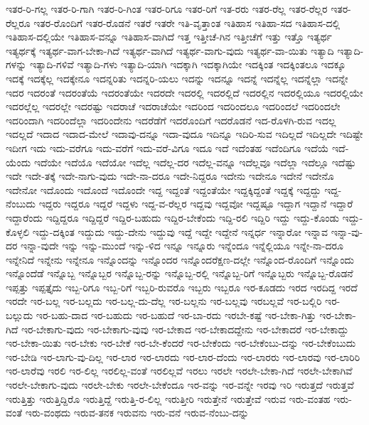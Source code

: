 {ಇತರ-ರಿ-ಗಲ್ಲ
ಇತರ-ರಿ-ಗಾಗಿ
ಇತರ-ರಿ-ಗಿಂತ
ಇತರ-ರಿಗೂ
ಇತರ-ರಿಗೆ
ಇತ-ರರು
ಇತರ-ರೆಲ್ಲ
ಇತರ-ರೆಲ್ಲರ
ಇತರ-ರೆಲ್ಲರೂ
ಇತರ-ರೊಂದಿಗೆ
ಇತರ-ರೊಡನೆ
ಇತರೆ
ಇತರೇ
ಇತಿ-ವೃತ್ತಾಂತ
ಇತಿಹಾಸ
ಇತಿಹಾ-ಸದ
ಇತಿಹಾಸ-ದಲ್ಲಿ
ಇತಿಹಾಸ-ದಲ್ಲಿಯೇ
ಇತಿಹಾಸ-ವನ್ನೂ
ಇತಿಹಾಸ-ವಾಗಿದೆ
ಇತ್ತ
ಇತ್ತೀಚೆ-ಗಿನ
ಇತ್ತೀಚೆಗೆ
ಇತ್ತು
ಇತ್ತೊ
ಇತ್ಯರ್ಥ
ಇತ್ಯರ್ಥಕ್ಕೆ
ಇತ್ಯರ್ಥ-ವಾಗ-ಬೇಕಾ-ಗಿದೆ
ಇತ್ಯರ್ಥ-ವಾಗಿದೆ
ಇತ್ಯರ್ಥ-ವಾಗು-ವುದು
ಇತ್ಯರ್ಥ-ವಾ-ಯಿತು
ಇತ್ಯಾದಿ
ಇತ್ಯಾದಿ-ಗಳನ್ನು
ಇತ್ಯಾದಿ-ಗಳಿವೆ
ಇತ್ಯಾದಿ-ಗಳು
ಇತ್ಯಾದಿ-ಯಾಗಿ
ಇದಕ್ಕಾಗಿ
ಇದಕ್ಕಾಗಿಯೇ
ಇದಕ್ಕಿಂತ
ಇದಕ್ಕಿಂತಲೂ
ಇದಕ್ಕೂ
ಇದಕ್ಕೆ
ಇದಕ್ಕೆಲ್ಲ
ಇದಕ್ಕೇನೂ
ಇದನ್ನರಿತು
ಇದನ್ನರಿ-ಯಲು
ಇದನ್ನು
ಇದನ್ನೂ
ಇದನ್ನೆ
ಇದನ್ನೆಲ್ಲ
ಇದನ್ನೆಲ್ಲಾ
ಇದನ್ನೇ
ಇದರ
ಇದರಂತೆ
ಇದರಂತೆಯೆ
ಇದರಂತೆಯೇ
ಇದರದೇ
ಇದರಲ್ಲಿ
ಇದರಲ್ಲಿದೆ
ಇದರಲ್ಲಿನ
ಇದರಲ್ಲಿಯೂ
ಇದರಲ್ಲಿಯೇ
ಇದರಲ್ಲೆಲ್ಲ
ಇದರಲ್ಲೇ
ಇದರಷ್ಟು
ಇದರಾಚೆ
ಇದರಾಚೆಯೇ
ಇದರಿಂದ
ಇದರಿಂದಲೂ
ಇದರಿಂದಲೆ
ಇದರಿಂದಲೇ
ಇದರಿಂದಾಗಿ
ಇದರಿಂದೆಲ್ಲಾ
ಇದರಿಂದೇನು
ಇದರೆಡೆಗೆ
ಇದರೊಂದಿಗೆ
ಇದರೊಡನೆ
ಇದ-ರೊಳಗಿ-ರುವ
ಇದಲ್ಲ
ಇದಲ್ಲದೆ
ಇದಾದ
ಇದಾದ-ಮೇಲೆ
ಇದಾವು-ದನ್ನೂ
ಇದಾ-ವುದೂ
ಇದಿನ್ನೂ
ಇದಿರಿ-ಸುವ
ಇದಿಲ್ಲದೆ
ಇದಿಲ್ಲದೇ
ಇದಿಷ್ಟೇ
ಇದೀಗ
ಇದು
ಇದು-ವರೆಗೂ
ಇದು-ವರೆಗೆ
ಇದು-ವರೆ-ವಿಗೂ
ಇದೂ
ಇದೆ
ಇದೆಂತಹ
ಇದೆಂದಿಗೂ
ಇದೆಯೆ
ಇದೆ-ಯೆಂದು
ಇದೆಯೇ
ಇದೆಯೊ
ಇದೆಯೋ
ಇದೆಲ್ಲ
ಇದೆಲ್ಲ-ದರ
ಇದೆಲ್ಲ-ವನ್ನೂ
ಇದೆಲ್ಲವೂ
ಇದೆಲ್ಲಾ
ಇದೆಲ್ಲೂ
ಇದೆಷ್ಟು
ಇದೇ
ಇದೇ-ತಕ್ಕೆ
ಇದೇ-ನಾಗು-ವುದು
ಇದೇ-ನಾ-ದರೂ
ಇದೇ-ನಿದ್ದರೂ
ಇದೇನು
ಇದೇನೂ
ಇದೇನೆ
ಇದೇನೊ
ಇದೇನೋ
ಇದೊಂದು
ಇದೊಂದೆ
ಇದೊಂದೇ
ಇದ್ದ
ಇದ್ದಂತೆ
ಇದ್ದಂತೆಯೇ
ಇದ್ದಕ್ಕಿದ್ದಂತೆ
ಇದ್ದಕ್ಕೆ
ಇದ್ದದ್ದು
ಇದ್ದ-ನೆಂಬುದು
ಇದ್ದರು
ಇದ್ದರೂ
ಇದ್ದರೆ
ಇದ್ದಳು
ಇದ್ದ-ವ-ರೆಲ್ಲರ
ಇದ್ದವು
ಇದ್ದವೋ
ಇದ್ದಷ್ಟೂ
ಇದ್ದಾಗ
ಇದ್ದಾನೆ
ಇದ್ದಾರೆ
ಇದ್ದಾರೆಂದು
ಇದ್ದಿದ್ದರೂ
ಇದ್ದಿದ್ದರೆ
ಇದ್ದಿರ-ಬಹುದು
ಇದ್ದಿರ-ಬೇಕೆಂದು
ಇದ್ದಿ-ರಲಿ
ಇದ್ದಿರಿ
ಇದ್ದು
ಇದ್ದು-ಕೊಂಡು
ಇದ್ದು-ಕೊಳ್ಳಲಿ
ಇದ್ದು-ದಕ್ಕಿಂತ
ಇದ್ದುದು
ಇದ್ದು-ದೇನು
ಇದ್ದುವು
ಇದ್ದೆ
ಇದ್ದೇ
ಇದ್ದೇನೆ
ಇನ್ನರ್ಧ
ಇನ್ನಾರೋ
ಇನ್ನಾವ
ಇನ್ನಾ-ವು-ದರ
ಇನ್ನಾ-ವುದೇ
ಇನ್ನು
ಇನ್ನು-ಮುಂದೆ
ಇನ್ನು-ಳಿದ
ಇನ್ನೂ
ಇನ್ನೂರು
ಇನ್ನೆಂದೂ
ಇನ್ನೆಲ್ಲಿಯೂ
ಇನ್ನೇ-ನಾ-ದರೂ
ಇನ್ನೇನಿದೆ
ಇನ್ನೇನು
ಇನ್ನೇನೂ
ಇನ್ನೊಂದನ್ನು
ಇನ್ನೊಂದರ
ಇನ್ನೊಂದರೆಕ್ಷಣ-ದಲ್ಲೇ
ಇನ್ನೊಂದ-ರೊಂದಿಗೆ
ಇನ್ನೊಂದು
ಇನ್ನೊಂದೆಡೆ
ಇನ್ನೊಬ್ಬ
ಇನ್ನೊಬ್ಬರ
ಇನ್ನೊಬ್ಬ-ರನ್ನು
ಇನ್ನೊಬ್ಬ-ರಲ್ಲಿ
ಇನ್ನೊಬ್ಬ-ರಿಗೆ
ಇನ್ನೊಬ್ಬರು
ಇನ್ನೊಬ್ಬ-ರೊಡನೆ
ಇಪ್ಪತ್ತು
ಇಪ್ಪತ್ತೈದು
ಇಬ್ಬ-ರಿಗೂ
ಇಬ್ಬ-ರಿಗೆ
ಇಬ್ಬರಿ-ರುವರೊ
ಇಬ್ಬರು
ಇಬ್ಬರೂ
ಇರ-ಕೂಡದು
ಇರದ
ಇರದಿದ್ದ
ಇರದೆ
ಇರದೇ
ಇರ-ಬಲ್ಲ
ಇರ-ಬಲ್ಲದು
ಇರ-ಬಲ್ಲ-ದು-ದೆಲ್ಲ
ಇರ-ಬಲ್ಲನು
ಇರ-ಬಲ್ಲವು
ಇರಬಲ್ಲವೆ
ಇರ-ಬಲ್ಲಿರಿ
ಇರ-ಬಲ್ಲುದು
ಇರ-ಬಹು-ದಾದ
ಇರ-ಬಹುದು
ಇರ-ಬಹುದೆ
ಇರ-ಬಾ-ರದು
ಇರಬೇ-ಕಷ್ಟೆ
ಇರ-ಬೇಕಾ-ಗಿತ್ತು
ಇರ-ಬೇಕಾ-ಗಿದೆ
ಇರ-ಬೇಕಾಗು-ವುದು
ಇರ-ಬೇಕಾಗು-ವುವು
ಇರ-ಬೇಕಾದ
ಇರ-ಬೇಕಾದದ್ದೇನು
ಇರ-ಬೇಕಾದರೆ
ಇರ-ಬೇಕಾದ್ದು
ಇರ-ಬೇಕಾ-ಯಿತು
ಇರ-ಬೇಕು
ಇರ-ಬೇಕೆ
ಇರ-ಬೇ-ಕೆಂದರೆ
ಇರ-ಬೇಕೆಂದು
ಇರ-ಬೇಕೆಂಬು-ದನ್ನು
ಇರ-ಬೇಕೆಂಬುದು
ಇರ-ಬೇಡಿ
ಇರ-ಲಾಗು-ವು-ದಿಲ್ಲ
ಇರ-ಲಾರ
ಇರ-ಲಾರದು
ಇರ-ಲಾರ-ದೆಂದು
ಇರ-ಲಾರರು
ಇರ-ಲಾರವು
ಇರ-ಲಾರಿರಿ
ಇರ-ಲಾರೆವು
ಇರಲಿ
ಇರ-ಲಿಲ್ಲ
ಇರಲಿಲ್ಲ-ವಂತೆ
ಇರಲಿಲ್ಲವೆ
ಇರಲು
ಇರಲೇ
ಇರಲೇ-ಬೇಕಾ-ಗಿದೆ
ಇರಲೇ-ಬೇಕಾಗಿವೆ
ಇರಲೇ-ಬೇಕಾಗು-ವುದು
ಇರಲೇ-ಬೇಕು
ಇರಲೇ-ಬೇಕೆಂದೂ
ಇರ-ವನ್ನು
ಇರ-ವನ್ನೇ
ಇರವು
ಇರಿ
ಇರುತ್ತದೆ
ಇರುತ್ತವೆ
ಇರುತ್ತಿತ್ತು
ಇರುತ್ತಿದ್ದಿರೊ
ಇರುತ್ತಿದ್ದೆ
ಇರುತ್ತಿ-ರ-ಲಿಲ್ಲ
ಇರುತ್ತೀರಿ
ಇರುತ್ತೇನೆ
ಇರುತ್ತೇವೆ
ಇರುವ
ಇರು-ವಂತಹ
ಇರು-ವಂತೆ
ಇರು-ವಂಥದು
ಇರುವ-ತನಕ
ಇರುವನು
ಇರು-ವನೆ
ಇರುವ-ನೆಂಬು-ದನ್ನು
}
